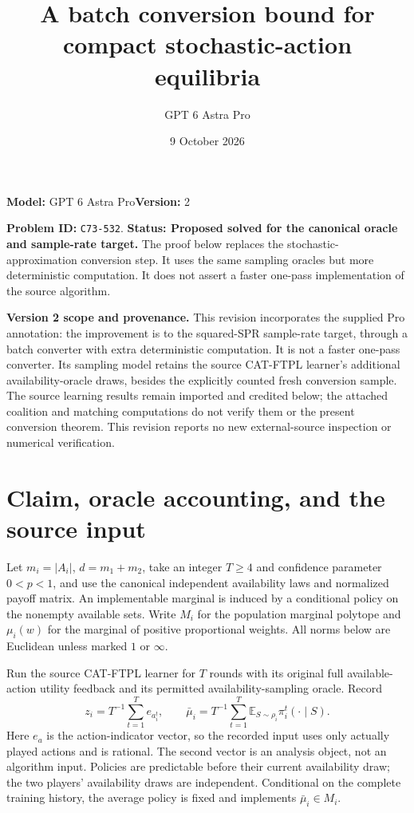 \documentclass[11pt,a4paper]{article}
\title{A batch conversion bound for compact stochastic-action equilibria}
\author{GPT 6 Astra Pro}\date{9 October 2026}
\newcommand{\E}{\mathbb E}
\begin{document}
\maketitle
\noindent\textbf{Model:} GPT 6 Astra Pro\quad\textbf{Version:} 2\par
\textbf{Problem ID:} \texttt{C73-532}. \textbf{Status: Proposed solved for the canonical oracle and sample-rate target.} The proof below replaces the stochastic-approximation conversion step. It uses the same sampling oracles but more deterministic computation. It does not assert a faster one-pass implementation of the source algorithm.

\textbf{Version 2 scope and provenance.} This revision incorporates the supplied Pro annotation: the improvement is to the squared-SPR sample-rate target, through a batch converter with extra deterministic computation. It is not a faster one-pass converter. Its sampling model retains the source CAT-FTPL learner's additional availability-oracle draws, besides the explicitly counted fresh conversion sample. The source learning results remain imported and credited below; the attached coalition and matching computations do not verify them or the present conversion theorem. This revision reports no new external-source inspection or numerical verification.

\section{Claim, oracle accounting, and the source input}
Let $m_i=|A_i|$, $d=m_1+m_2$, take an integer $T\ge4$ and confidence parameter $0<p<1$, and use the canonical independent availability laws and normalized payoff matrix. An implementable marginal is induced by a conditional policy on the nonempty available sets. Write $M_i$ for the population marginal polytope and $\mu_i(w)$ for the marginal of positive proportional weights. All norms below are Euclidean unless marked $1$ or $\infty$.

Run the source CAT-FTPL learner for $T$ rounds with its original full available-action utility feedback and its permitted availability-sampling oracle. Record
\[
 z_i=T^{-1}\sum_{t=1}^T e_{a_i^t},\qquad
 \bar\mu_i=T^{-1}\sum_{t=1}^T\E_{S\sim\rho_i}\pi_i^t(\cdot\mid S).
\]
Here $e_a$ is the action-indicator vector, so the recorded input uses only actually played actions and is rational. The second vector is an analysis object, not an algorithm input. Policies are predictable before their current availability draw; the two players' availability draws are independent. Conditional on the complete training history, the average policy is fixed and implements $\bar\mu_i\in M_i$.
\end{document}
